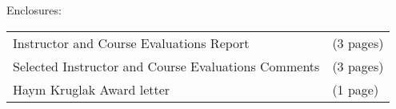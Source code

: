 %
\vspace{2.0\baselineskip}%
{\setlength{\parindent}{0in}
Enclosures:
\vspace{2pt}%
\begin{changemargin}{9pt}
\renewcommand{\arraystretch}{1.0} %
\begin{tabular}{ll}%
Instructor and Course Evaluations Report & (3 pages)\\%
Selected Instructor and Course Evaluations Comments& (3 pages)\\%
Haym Kruglak Award letter & (1 page)\\%
\end{tabular}%
\end{changemargin}
}
{}
{}
{}